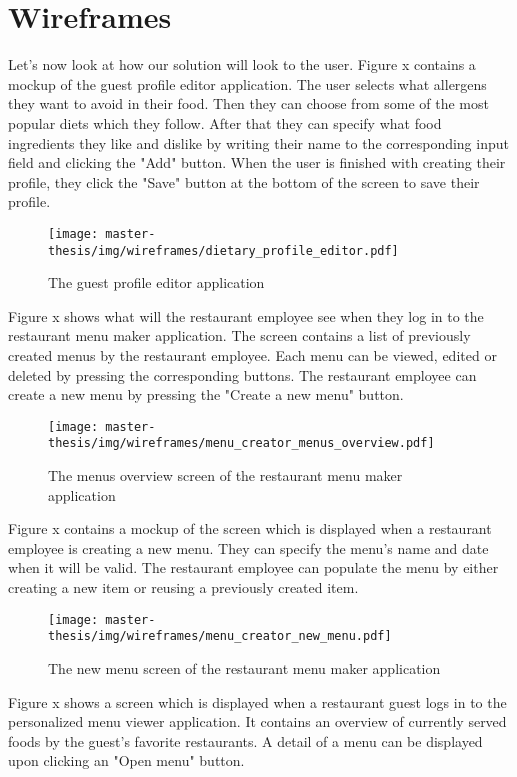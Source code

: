 \section{Wireframes}
Let's now look at how our solution will look to the user.
Figure x contains a mockup of the guest profile editor application.
The user selects what allergens they want to avoid in their food.
Then they can choose from some of the most popular diets which they follow.
After that they can specify what food ingredients they like and dislike by writing their name to the corresponding input field and clicking the "Add" button.
When the user is finished with creating their profile, they click the "Save" button at the bottom of the screen to save their profile.

\begin{figure}[h]
  \centering
  \texttt{[image: master-thesis/img/wireframes/dietary\_profile\_editor.pdf]}
  \caption{The guest profile editor application}
\end{figure}

Figure x shows what will the restaurant employee see when they log in to the restaurant menu maker application.
The screen contains a list of previously created menus by the restaurant employee.
Each menu can be viewed, edited or deleted by pressing the corresponding buttons.
The restaurant employee can create a new menu by pressing the "Create a new menu" button.

\begin{figure}[h]
  \centering
  \texttt{[image: master-thesis/img/wireframes/menu\_creator\_menus\_overview.pdf]}
  \caption{The menus overview screen of the restaurant menu maker application}
\end{figure}

Figure x contains a mockup of the screen which is displayed when a restaurant employee is creating a new menu.
They can specify the menu's name and date when it will be valid.
The restaurant employee can populate the menu by either creating a new item or reusing a previously created item.

\begin{figure}[h]
  \centering
  \texttt{[image: master-thesis/img/wireframes/menu\_creator\_new\_menu.pdf]}
  \caption{The new menu screen of the restaurant menu maker application}
\end{figure}

Figure x shows a screen which is displayed when a restaurant guest logs in to the personalized menu viewer application.
It contains an overview of currently served foods by the guest's favorite restaurants.
A detail of a menu can be displayed upon clicking an "Open menu" button.

